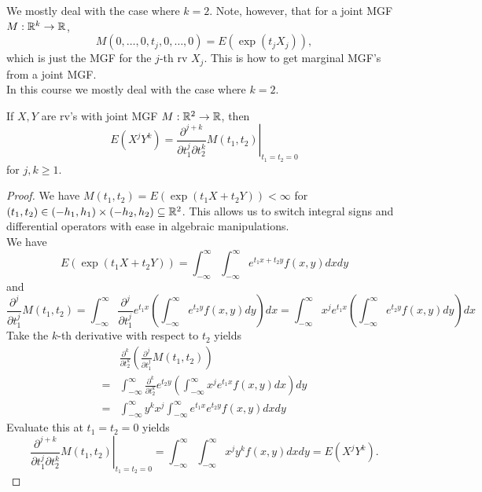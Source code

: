 \documentclass[11pt,fleqn]{book} %
\begin{document}
\begin{remark} \label{rmk:282}
We mostly deal with the case where \(k = 2\). Note, however, that for a joint MGF \(M:\mathbb{R}^k\rightarrow\mathbb{R}\), 
\[
M(0, \ldots, 0, t_j, 0, \ldots, 0) = E(\exp(t_jX_j)),
\]
which is just the MGF for the \(j\)-th rv \(X_j\). This is how to get marginal MGF's from a joint MGF. \\
\indent In this course we mostly deal with the case where \(k = 2\).
\end{remark}

\begin{theorem} \label{thm:283}
If \(X, Y\) are rv's with joint MGF \(M:\mathbb{R}^2\rightarrow\mathbb{R}\), then
\[
E(X^jY^k) = \left.\frac{\partial^{j+k}}{\partial t_1^j\partial t_2^k}M(t_1, t_2)\right|_{t_1=t_2=0}
\]
for \(j, k \geq 1\).
\end{theorem}
\begin{proof} We have \(M(t_1, t_2) = E(\exp(t_1X + t_2Y)) < \infty\) for \((t_1, t_2) \in (-h_1, h_1) \times (-h_2, h_2) \subseteq \mathbb{R}^2\). This allows us to switch integral signs and differential operators with ease in algebraic manipulations.\\
\indent We have
\[
E(\exp(t_1X + t_2Y)) = \int_{-\infty}^\infty\int_{-\infty}^\infty e^{t_1x + t_2y} f(x, y)dxdy
\]
and
\[
\frac{\partial^j}{\partial t_1^j}M(t_1, t_2) = \int_{-\infty}^\infty\frac{\partial^j}{\partial t_1^j}e^{t_1x}\left(\int_{-\infty}^\infty e^{t_2y}f(x, y)dy\right)dx 
= \int_{-\infty}^\infty x^j e^{t_1x}\left(\int_{-\infty}^\infty e^{t_2y} f(x, y)dy\right)dx
\]
\indent Take the \(k\)-th derivative with respect to \(t_2\) yields
\[
\begin{aligned}
&\frac{\partial^k}{\partial t_2^k}\left(\frac{\partial^j}{\partial t_1^j}M(t_1, t_2)\right) \\
= &\int_{-\infty}^\infty \frac{\partial^k}{\partial t_2^k}e^{t_2y}\left(\int_{-\infty}^\infty x^je^{t_1x}f(x, y)dx\right)dy \\
= &\int_{-\infty}^\infty y^kx^j \int_{-\infty}^\infty e^{t_1x}e^{t_2y} f(x, y)dxdy
\end{aligned}
\]
\indent Evaluate this at \(t_1 = t_2 = 0\) yields 
\[
\left.\frac{\partial^{j+k}}{\partial t_1^j\partial t_2^k}M(t_1, t_2)\right|_{t_1=t_2=0} = \int_{-\infty}^\infty \int_{-\infty}^\infty x^j y^k f(x, y)dxdy = E(X^j Y^k).
\]
\end{proof}
\end{document}
